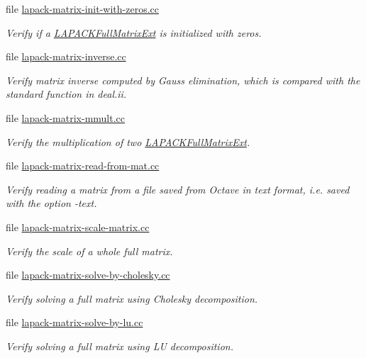 \begin{DoxyCompactItemize}
file \hyperlink{lapack-matrix-init-with-zeros_8cc}{lapack-\/matrix-\/init-\/with-\/zeros.\+cc}
\begin{DoxyCompactList}\small\item\em Verify if a \hyperlink{classLAPACKFullMatrixExt}{L\+A\+P\+A\+C\+K\+Full\+Matrix\+Ext} is initialized with zeros. \end{DoxyCompactList}\item 
file \hyperlink{lapack-matrix-inverse_8cc}{lapack-\/matrix-\/inverse.\+cc}
\begin{DoxyCompactList}\small\item\em Verify matrix inverse computed by Gauss elimination, which is compared with the standard function in deal.\+ii. \end{DoxyCompactList}\item 
file \hyperlink{lapack-matrix-mmult_8cc}{lapack-\/matrix-\/mmult.\+cc}
\begin{DoxyCompactList}\small\item\em Verify the multiplication of two {\ttfamily \hyperlink{classLAPACKFullMatrixExt}{L\+A\+P\+A\+C\+K\+Full\+Matrix\+Ext}}. \end{DoxyCompactList}\item 
file \hyperlink{lapack-matrix-read-from-mat_8cc}{lapack-\/matrix-\/read-\/from-\/mat.\+cc}
\begin{DoxyCompactList}\small\item\em Verify reading a matrix from a file saved from Octave in text format, i.\+e. saved with the option {\ttfamily -\/text}. \end{DoxyCompactList}\item 
file \hyperlink{lapack-matrix-scale-matrix_8cc}{lapack-\/matrix-\/scale-\/matrix.\+cc}
\begin{DoxyCompactList}\small\item\em Verify the scale of a whole full matrix. \end{DoxyCompactList}\item 
file \hyperlink{lapack-matrix-solve-by-cholesky_8cc}{lapack-\/matrix-\/solve-\/by-\/cholesky.\+cc}
\begin{DoxyCompactList}\small\item\em Verify solving a full matrix using Cholesky decomposition. \end{DoxyCompactList}\item 
file \hyperlink{lapack-matrix-solve-by-lu_8cc}{lapack-\/matrix-\/solve-\/by-\/lu.\+cc}
\begin{DoxyCompactList}\small\item\em Verify solving a full matrix using LU decomposition. \end{DoxyCompactList}\item 

\end{DoxyCompactItemize}
